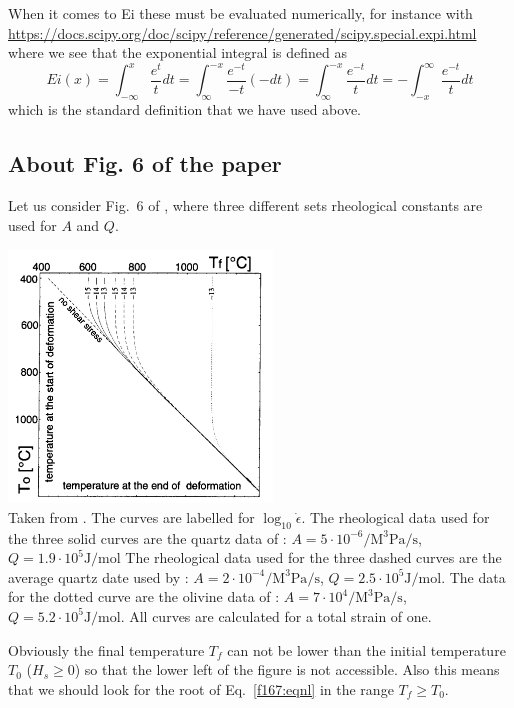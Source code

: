 When it comes to Ei these must be evaluated numerically, for instance with 
\url{https://docs.scipy.org/doc/scipy/reference/generated/scipy.special.expi.html}
where we see that 
the exponential integral is defined as 
\[
Ei(x) 
= \int_{-\infty} ^x \frac{e^t}{t}dt
= \int_{\infty}^{-x} \frac{e^{-t}}{-t} (-dt)
= \int_{\infty}^{-x} \frac{e^{-t}}{t} dt
= -\int_{-x}^\infty \frac{e^{-t}}{t} dt
\]
which is the standard definition that we have used above.


\newpage
\subsection*{About Fig. 6 of the paper}

Let us consider Fig.~6 of \textcite{stuw98}, where three different sets rheological constants are used
for $A$ and $Q$.

\begin{center}
\includegraphics[width=7cm]{python_codes/fieldstone_167/images/stuw98_fig6}\\
{\captionfont  Taken from \cite{stuw98}.
The curves are labelled for $\log_{10} \dot\epsilon$. 
The rheological data used for the three solid curves are the quartz data of \cite{brko80}:
$A=5\cdot 10^{-6} \si{\per\cubic\mega\pascal \per \second} $, $Q=1.9\cdot 10^5 \si{\joule\per\mol}$
The rheological data
used for the three dashed curves are the average quartz date used
by \cite{stsa94}: $A=2\cdot 10^{-4} \si{\per\cubic\mega\pascal \per \second} $, $Q=2.5\cdot 10^5 \si{\joule\per\mol}$. The data for the dotted curve are the
olivine data of \cite{brko80}: 
$A=7\cdot 10^{4} \si{\per\cubic\mega\pascal \per \second} $, $Q=5.2\cdot 10^5 \si{\joule\per\mol}$. All curves are calculated for
a total strain of one.
}
\end{center}

Obviously the final temperature $T_f$ can not be lower than the initial temperature $T_0$
($H_s\ge 0$) so that the lower left of the figure is not accessible. Also this means that we should
look for the root of Eq.~\eqref{f167:eqnl} in the range $T_f\ge T_0$.

